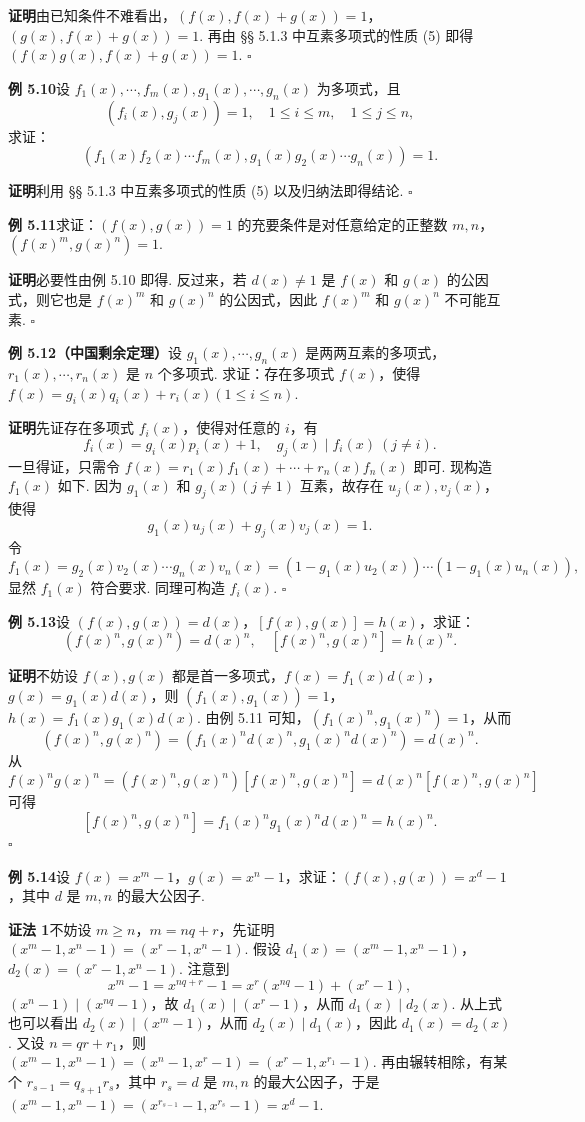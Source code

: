 \documentclass[UTF8, 12pt, fontset=fandol, oneside]{ctexart}
\begin{document}
\noindent\textbf{证明}\quad 由已知条件不难看出，$(f(x),f(x)+g(x))=1$，$(g(x),f(x)+g(x))=1$. 再由 §§ 5.1.3 中互素多项式的性质 (5) 即得 $(f(x)g(x),f(x)+g(x))=1$. \hfill $\square$

\noindent\textbf{例 5.10}\quad 设 $f_1(x),\cdots,f_m(x),g_1(x),\cdots,g_n(x)$ 为多项式，且
\[
(f_i(x),g_j(x))=1,\quad 1\le i\le m,\quad 1\le j\le n,
\]
求证：
\[
(f_1(x)f_2(x)\cdots f_m(x),g_1(x)g_2(x)\cdots g_n(x))=1.
\]

\noindent\textbf{证明}\quad 利用 §§ 5.1.3 中互素多项式的性质 (5) 以及归纳法即得结论. \hfill $\square$

\noindent\textbf{例 5.11}\quad 求证：$(f(x),g(x))=1$ 的充要条件是对任意给定的正整数 $m,n$，$(f(x)^m,g(x)^n)=1$.

\noindent\textbf{证明}\quad 必要性由例 5.10 即得. 反过来，若 $d(x)\ne1$ 是 $f(x)$ 和 $g(x)$ 的公因式，则它也是 $f(x)^m$ 和 $g(x)^n$ 的公因式，因此 $f(x)^m$ 和 $g(x)^n$ 不可能互素. \hfill $\square$

\noindent\textbf{例 5.12（中国剩余定理）}\quad 设 $g_1(x),\cdots,g_n(x)$ 是两两互素的多项式，$r_1(x),\cdots,r_n(x)$ 是 $n$ 个多项式. 求证：存在多项式 $f(x)$，使得 $f(x)=g_i(x)q_i(x)+r_i(x)(1\le i\le n)$.

\noindent\textbf{证明}\quad 先证存在多项式 $f_i(x)$，使得对任意的 $i$，有
\[
f_i(x)=g_i(x)p_i(x)+1,\quad g_j(x)\mid f_i(x)\ (j\ne i).
\]
一旦得证，只需令 $f(x)=r_1(x)f_1(x)+\cdots+r_n(x)f_n(x)$ 即可. 现构造 $f_1(x)$ 如下. 因为 $g_1(x)$ 和 $g_j(x)(j\ne1)$ 互素，故存在 $u_j(x),v_j(x)$，使得
\[
g_1(x)u_j(x)+g_j(x)v_j(x)=1.
\]
令
\[
f_1(x)=g_2(x)v_2(x)\cdots g_n(x)v_n(x)
=(1-g_1(x)u_2(x))\cdots(1-g_1(x)u_n(x)),
\]
显然 $f_1(x)$ 符合要求. 同理可构造 $f_i(x)$. \hfill $\square$

\noindent\textbf{例 5.13}\quad 设 $(f(x),g(x))=d(x)$，$[f(x),g(x)]=h(x)$，求证：
\[
(f(x)^n,g(x)^n)=d(x)^n,\quad [f(x)^n,g(x)^n]=h(x)^n.
\]

\noindent\textbf{证明}\quad 不妨设 $f(x),g(x)$ 都是首一多项式，$f(x)=f_1(x)d(x)$，$g(x)=g_1(x)d(x)$，则 $(f_1(x),g_1(x))=1$，$h(x)=f_1(x)g_1(x)d(x)$. 由例 5.11 可知，$(f_1(x)^n,g_1(x)^n)=1$，从而
\[
(f(x)^n,g(x)^n)=(f_1(x)^nd(x)^n,g_1(x)^nd(x)^n)=d(x)^n.
\]
从 $f(x)^ng(x)^n=(f(x)^n,g(x)^n)[f(x)^n,g(x)^n]=d(x)^n[f(x)^n,g(x)^n]$ 可得
\[
[f(x)^n,g(x)^n]=f_1(x)^ng_1(x)^nd(x)^n=h(x)^n.
\]
\hfill $\square$

\noindent\textbf{例 5.14}\quad 设 $f(x)=x^m-1$，$g(x)=x^n-1$，求证：$(f(x),g(x))=x^d-1$，其中 $d$ 是 $m,n$ 的最大公因子.

\noindent\textbf{证法 1}\quad 不妨设 $m\ge n$，$m=nq+r$，先证明 $(x^m-1,x^n-1)=(x^r-1,x^n-1)$. 假设 $d_1(x)=(x^m-1,x^n-1)$，$d_2(x)=(x^r-1,x^n-1)$. 注意到
\[
x^m-1=x^{nq+r}-1=x^r(x^{nq}-1)+(x^r-1),
\]
$(x^n-1)\mid (x^{nq}-1)$，故 $d_1(x)\mid (x^r-1)$，从而 $d_1(x)\mid d_2(x)$. 从上式也可以看出 $d_2(x)\mid (x^m-1)$，从而 $d_2(x)\mid d_1(x)$，因此 $d_1(x)=d_2(x)$. 又设 $n=qr+r_1$，则 $(x^m-1,x^n-1)=(x^n-1,x^r-1)=(x^r-1,x^{r_1}-1)$. 再由辗转相除，有某个 $r_{s-1}=q_{s+1}r_s$，其中 $r_s=d$ 是 $m,n$ 的最大公因子，于是 $(x^m-1,x^n-1)=(x^{r_{s-1}}-1,x^{r_s}-1)=x^d-1$.
\end{document}
